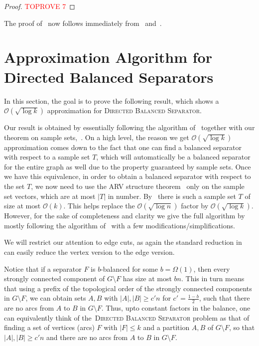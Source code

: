 \documentclass[11pt]{article}
\newcommand{\OO}{\mathcal{O}}
\newcommand{\DB}{{\textsc{Directed Balanced Separator}}}
\begin{document}
{\begin{proof}\textcolor{red}{TOPROVE 7}\end{proof}




The proof of~ now follows immediately from~ and~.  







\section{Approximation Algorithm for Directed Balanced Separators}


In this section, the goal is to prove the following result, which shows a $\OO(\sqrt{\log k})$ approximation for \DB{}. 
\approxbalsep








Our result is obtained by essentially following the algorithm of~\cite{agarwal2005log} together with our theorem on sample sets,~. On a high level, the reason we get $\OO(\sqrt{\log k})$ approximation comes down to the fact that one can find a balanced separator with respect to a sample set $T$, which will automatically be a balanced separator for the entire graph as well due to the property guaranteed by sample sets. Once we have this equivalence, in order to obtain a balanced separator with respect to the set $T$, we now need to use the ARV structure theorem~\cite{arora2009expander} only on the sample set vectors, which are at most $|T|$ in number. By~ there is such a sample set $T$ of size at most $\OO(k)$. This helps replace the $\OO(\sqrt{\log n})$ factor by $\OO(\sqrt{\log k})$. However, for the sake of completeness and clarity we give the full algorithm by mostly following the algorithm of~\cite{agarwal2005log} with a few modifications/simplifications.

We will restrict our attention to edge cuts, as again the standard reduction in~ can easily reduce the vertex version to the edge version.



Notice that if a separator $F$ is $b$-balanced for some $b = \Omega(1)$, then every strongly connected component of $G \setminus F$ has size at most $bn$. This in turn means that using a prefix of the topological order of the strongly connected components in $G \setminus F$, we can obtain sets $A,B$ with $|A|, |B| \geq c'n$ for  $c' = \frac{1-b}{2}$, such that there are no arcs from $A$ to $B$ in $G \setminus F$. Thus, upto constant factors in the balance, one can equivalently think of the~\DB{} problem as that of finding a set of vertices (arcs) $F$ with $|F| \leq k$ and a partition $A,B$ of $G \setminus F$, so that $|A|, |B| \geq c'n$ and there are no arcs from $A$ to $B$ in $G \setminus F$. 

}
\end{document}
